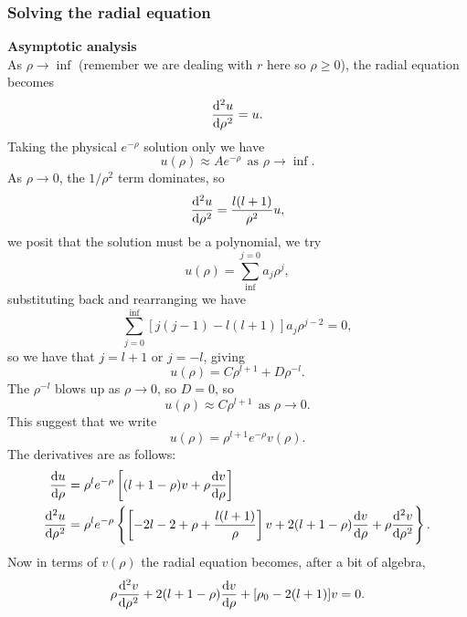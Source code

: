 \subsubsection{Solving the radial equation}
\textbf{Asymptotic analysis}\\
As $\rho\rightarrow\inf$ (remember we are dealing with $r$ here so $\rho\geq0$), 
the radial equation becomes 
\begin{equation}
\diff[2]u\rho=u. 
\end{equation}
Taking the physical $e^{-\rho}$ solution only we have
\begin{equation}
u(\rho)\approx Ae^{-\rho}\ \ \text{as }\rho\rightarrow\inf.
\end{equation}
As $\rho\rightarrow0$, the $1/\rho^2$ term dominates, so
\begin{equation}
\diff[2]u\rho=\frac{l(l+1)}{\rho^2}u, 
\end{equation}
we posit that the solution must be a polynomial, we try 
\begin{equation}
u(\rho)=\sum^{j=0}_{\inf} a_j\rho^j, 
\end{equation}
substituting back and rearranging we have 
\begin{equation}
\sum_{j=0}^{\inf} [j(j-1)-l(l+1)]a_j\rho^{j-2}=0,
\end{equation}
so we have that $j=l+1$ or $j=-l$, giving
\begin{equation}
u(\rho)=C\rho^{l+1}+D\rho^{-l}.
\end{equation}
The $\rho^{-l}$ blows up as $\rho\rightarrow0$, so $D=0$, so
\begin{equation}
u(\rho)\approx C\rho^{l+1}\ \ \text{as }\rho\rightarrow0.
\end{equation}
This suggest that we write
\begin{equation}
u(\rho)=\rho^{l+1}e^{-\rho}v(\rho).
\end{equation}
The derivatives are as follows:
\begin{subequations}
\begin{align}
\diff u\rho&=\rho^le^{-\rho}\lf[(l+1-\rho)v+\rho\diff v\rho \rt]\\
\diff[2] u\rho&=\rho^le^{-\rho}\lf\{\lf[-2l-2+\rho+\frac{l(l+1)}{\rho} \rt]v+2(l+1-\rho)\diff v\rho+\rho\diff[2]v\rho \rt\}. 
\end{align}
\end{subequations}
Now in terms of $v(\rho)$ the radial equation becomes, after a bit of algebra, 
\begin{equation}
\rho\diff[2]v\rho+2(l+1-\rho)\diff v\rho+[\rho_0-2(l+1)]v=0.
\end{equation}
